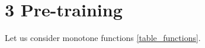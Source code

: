 \documentclass[12pt,twoside]{article}
\begin{document}
\section{3 Pre-training}
	Let us consider monotone functions \ref{table_functions}.
\end{document}
